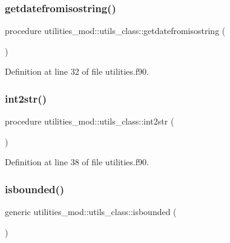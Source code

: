 \subsubsection{\texorpdfstring{getdatefromisostring()}{getdatefromisostring()}}
{\footnotesize\ttfamily procedure utilities\+\_\+mod\+::utils\+\_\+class\+::getdatefromisostring (\begin{DoxyParamCaption}{ }\end{DoxyParamCaption})\hspace{0.3cm}{\ttfamily [private]}}



Definition at line 32 of file utilities.\+f90.

\mbox{\label{structutilities__mod_1_1utils__class_ae3a7fea394d64f5f4592504841b07777}} 
\subsubsection{\texorpdfstring{int2str()}{int2str()}}
{\footnotesize\ttfamily procedure utilities\+\_\+mod\+::utils\+\_\+class\+::int2str (\begin{DoxyParamCaption}{ }\end{DoxyParamCaption})\hspace{0.3cm}{\ttfamily [private]}}



Definition at line 38 of file utilities.\+f90.

\mbox{\label{structutilities__mod_1_1utils__class_acd0be828aa3a873c635cb9742ef06b13}} 
\subsubsection{\texorpdfstring{isbounded()}{isbounded()}}
{\footnotesize\ttfamily generic utilities\+\_\+mod\+::utils\+\_\+class\+::isbounded (\begin{DoxyParamCaption}{ }\end{DoxyParamCaption})\hspace{0.3cm}{\ttfamily [private]}}



